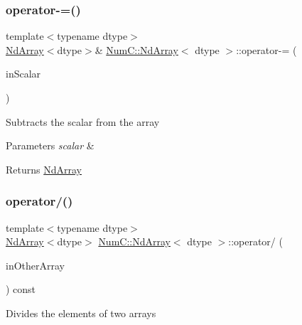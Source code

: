 \subsubsection{\texorpdfstring{operator-\/=()}{operator-=()}\hspace{0.1cm}{\footnotesize\ttfamily [2/2]}}
{\footnotesize\ttfamily template$<$typename dtype$>$ \\
\mbox{\hyperlink{class_num_c_1_1_nd_array}{Nd\+Array}}$<$dtype$>$\& \mbox{\hyperlink{class_num_c_1_1_nd_array}{Num\+C\+::\+Nd\+Array}}$<$ dtype $>$\+::operator-\/= (\begin{DoxyParamCaption}\item[{dtype}]{in\+Scalar }\end{DoxyParamCaption})\hspace{0.3cm}{\ttfamily [inline]}}

Subtracts the scalar from the array


\begin{DoxyParams}{Parameters}
{\em scalar} & \\
\hline
\end{DoxyParams}
\begin{DoxyReturn}{Returns}
\mbox{\hyperlink{class_num_c_1_1_nd_array}{Nd\+Array}} 
\end{DoxyReturn}
\mbox{\label{class_num_c_1_1_nd_array_a931a3c3251279020beab2c1f198283a7}} 
\subsubsection{\texorpdfstring{operator/()}{operator/()}\hspace{0.1cm}{\footnotesize\ttfamily [1/2]}}
{\footnotesize\ttfamily template$<$typename dtype$>$ \\
\mbox{\hyperlink{class_num_c_1_1_nd_array}{Nd\+Array}}$<$dtype$>$ \mbox{\hyperlink{class_num_c_1_1_nd_array}{Num\+C\+::\+Nd\+Array}}$<$ dtype $>$\+::operator/ (\begin{DoxyParamCaption}\item[{const \mbox{\hyperlink{class_num_c_1_1_nd_array}{Nd\+Array}}$<$ dtype $>$ \&}]{in\+Other\+Array }\end{DoxyParamCaption}) const\hspace{0.3cm}{\ttfamily [inline]}}

Divides the elements of two arrays


